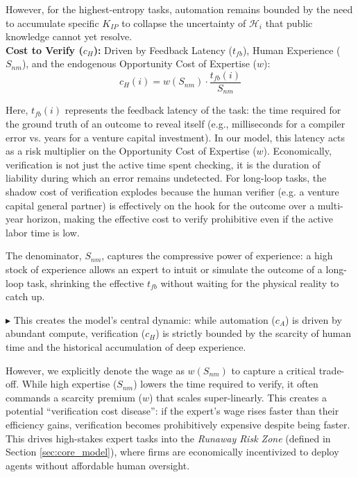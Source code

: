 \documentclass[12pt, letter]{article}
\begin{document}
However, for the highest-entropy tasks, automation remains bounded by the need to accumulate specific $K_{IP}$ to collapse the uncertainty of $\mathcal{H}_i$ that public knowledge cannot yet resolve. \\

\textbf{Cost to Verify ($c_H$):} Driven by Feedback Latency ($t_{fb}$), Human Experience ($S_{nm}$), and the endogenous Opportunity Cost of Expertise ($w$):
    \begin{equation}
        c_H(i) = w(S_{nm}) \cdot \frac{t_{fb}(i)}{S_{nm}}
    \end{equation}

Here, $t_{fb}(i)$ represents the feedback latency of the task: the time required for the ground truth of an outcome to reveal itself (e.g., milliseconds for a compiler error vs. years for a venture capital investment). In our model, this latency acts as a risk multiplier on the Opportunity Cost of Expertise ($w$). Economically, verification is not just the active time spent checking, it is the duration of liability during which an error remains undetected. For long-loop tasks, the shadow cost of verification explodes because the human verifier (e.g. a venture capital general partner) is effectively on the hook for the outcome over a multi-year horizon, making the effective cost to verify prohibitive even if the active labor time is low.

The denominator, $S_{nm}$, captures the compressive power of experience: a high stock of experience allows an expert to intuit or simulate the outcome of a long-loop task, shrinking the effective $t_{fb}$ without waiting for the physical reality to catch up. 

$\blacktriangleright$ This creates the model's central dynamic: while automation ($c_A$) is driven by abundant compute, verification ($c_H$) is strictly bounded by the scarcity of human time and the historical accumulation of deep experience.

However, we explicitly denote the wage as $w(S_{nm})$ to capture a critical trade-off. While high expertise ($S_{nm}$) lowers the time required to verify, it often commands a scarcity premium ($w$) that scales super-linearly. This creates a potential ``verification cost disease'': if the expert's wage rises faster than their efficiency gains, verification becomes prohibitively expensive despite being faster. This drives high-stakes expert tasks into the \emph{Runaway Risk Zone} (defined in Section \ref{sec:core_model}), where firms are economically incentivized to deploy agents without affordable human oversight.
\end{document}
